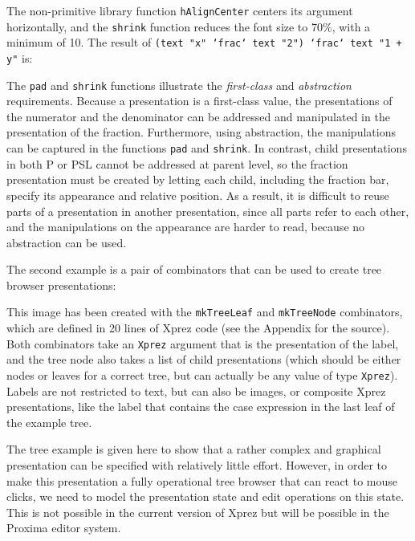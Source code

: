 \noindent The non-primitive library function \texttt{hAlignCenter} centers its argument horizontally, and the \texttt{shrink} function reduces the font size to 70\%, with a minimum of 10. The result of \texttt{(text "x" `frac` text "2") `frac` text "1 + y"} is:

\begin{center}
\end{center}

The \texttt{pad} and \texttt{shrink} functions illustrate the {\em first-class} and {\em abstraction} requirements. Because a presentation is a first-class value, the presentations of the numerator and the denominator can be addressed and manipulated in the presentation of the fraction. Furthermore, using abstraction, the manipulations can be captured in the functions \texttt{pad} and \texttt{shrink}. In contrast, child presentations in both P or PSL cannot be addressed at parent level, so the fraction presentation must be created by letting each child, including the fraction bar, specify its appearance and relative position. As a result, it is difficult to reuse parts of a presentation in another presentation, since all parts refer to each other, and the manipulations on the appearance are harder to read, because no abstraction can be used. 

The second example is a pair of combinators that can be used to create tree browser presentations:

\begin{center}
\end{center}

\noindent This image has been created with the \texttt{mkTreeLeaf} and \texttt{mkTreeNode} combinators, which are defined in 20 lines of {\sc Xprez} code (see the Appendix for the source). Both combinators take an \texttt{Xprez} argument that is the presentation of the label, and the tree node also takes a list of child presentations (which should be either nodes or leaves for a correct tree, but can actually be any value of type \texttt{Xprez}). Labels are not restricted to text, but can also be images, or composite {\sc Xprez} presentations, like the label that contains the case expression in the last leaf of the example tree. 

The tree example is given here to show that a rather complex and graphical presentation can be specified with relatively little effort. However, in order to make this presentation a fully operational tree browser that can react to mouse clicks, we need to model the presentation state and edit operations on this state. This is not possible in the current version of {\sc Xprez} but will be possible in the Proxima editor system.


